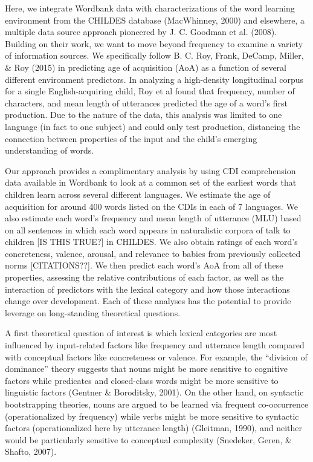 \documentclass[10pt, letterpaper]{article}
\begin{document}
Here, we integrate Wordbank data with characterizations of the word
learning environment from the CHILDES database (MacWhinney, 2000) and
elsewhere, a multiple data source approach pioneered by J. C. Goodman et
al. (2008). Building on their work, we want to move beyond frequency to
examine a variety of information sources. We specifically follow B. C.
Roy, Frank, DeCamp, Miller, \& Roy (2015) in predicting age of
acquisition (AoA) as a function of several different environment
predictors. In analyzing a high-density longitudinal corpus for a single
English-acquiring child, Roy et al found that frequency, number of
characters, and mean length of utterances predicted the age of a word's
first production. Due to the nature of the data, this analysis was
limited to one language (in fact to one subject) and could only test
production, distancing the connection between properties of the input
and the child's emerging understanding of words.

Our approach provides a complimentary analysis by using CDI
comprehension data available in Wordbank to look at a common set of the
earliest words that children learn across several different languages.
We estimate the age of acquisition for around 400 words listed on the
CDIs in each of 7 languages. We also estimate each word's frequency and
mean length of utterance (MLU) based on all sentences in which each word
appears in naturalistic corpora of talk to children {[}IS THIS TRUE?{]}
in CHILDES. We also obtain ratings of each word's concreteness, valence,
arousal, and relevance to babies from previously collected norms
{[}CITATIONS??{]}. We then predict each word's AoA from all of these
properties, assessing the relative contributions of each factor, as well
as the interaction of predictors with the lexical category and how those
interactions change over development. Each of these analyses has the
potential to provide leverage on long-standing theoretical questions.

A first theoretical question of interest is which lexical categories are
most influenced by input-related factors like frequency and utterance
length compared with conceptual factors like concreteness or valence.
For example, the ``division of dominance'' theory suggests that nouns
might be more sensitive to cognitive factors while predicates and
closed-class words might be more sensitive to linguistic factors
(Gentner \& Boroditsky, 2001). On the other hand, on syntactic
bootstrapping theories, nouns are argued to be learned via frequent
co-occurrence (operationalized by frequency) while verbs might be more
sensitive to syntactic factors (operationalized here by utterance
length) (Gleitman, 1990), and neither would be particularly sensitive to
conceptual complexity (Snedeker, Geren, \& Shafto, 2007).
\end{document}
